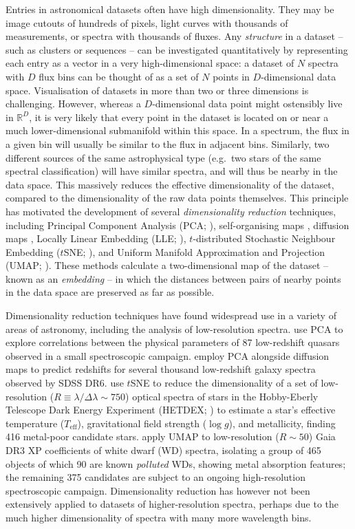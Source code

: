 \documentclass[fleqn,usenatbib]{mnras}
\def\Teff{T_\mathrm{eff}}
\begin{document}
Entries in astronomical datasets often have high dimensionality.
They may be image cutouts of hundreds of pixels, light curves with thousands of measurements, or spectra with thousands of fluxes.
Any \textit{structure} in a dataset -- such as clusters or sequences -- can be investigated quantitatively by representing each entry as a vector in a very high-dimensional space: a dataset of $N$ spectra with $D$ flux bins can be thought of as a set of $N$ points in $D$-dimensional data space.
Visualisation of datasets in more than two or three dimensions is challenging.
However, whereas a $D$-dimensional data point might ostensibly live in $\mathbb{R}^D$, it is very likely that every point in the dataset is located on or near a much lower-dimensional submanifold within this space.
In a spectrum, the flux in a given bin will usually be similar to the flux in adjacent bins.
Similarly, two different sources of the same astrophysical type (e.g.\ two stars of the same spectral classification) will have similar spectra, and will thus be nearby in the data space.
This massively reduces the effective dimensionality of the dataset, compared to the dimensionality of the raw data points themselves.
This principle has motivated the development of several \textit{dimensionality reduction} techniques, including Principal Component Analysis (PCA; \citealt{pca}), self-organising maps \citep{kohonen90}, diffusion maps \citep{coifman06, lafon06}, Locally Linear Embedding (LLE; \citealt{roweis00}), $t$-distributed Stochastic Neighbour Embedding ($t$SNE; \citealt{tsne}), and Uniform Manifold Approximation and Projection (UMAP; \citealt{umap}).
These methods calculate a two-dimensional map of the dataset -- known as an \textit{embedding} -- in which the distances between pairs of nearby points in the data space are preserved as far as possible.

Dimensionality reduction techniques have found widespread use in a variety of areas of astronomy, including the analysis of low-resolution spectra.
\citet{boroson92} use PCA to explore correlations between the physical parameters of 87 low-redshift quasars observed in a small spectroscopic campaign.
\citet{richards09} employ PCA alongside diffusion maps to predict redshifts for several thousand low-redshift galaxy spectra observed by SDSS DR6.
\citet{hawkins21} use $t$SNE to reduce the dimensionality of a set of low-resolution ($R\equiv \lambda / \Delta \lambda \sim750$) optical spectra of stars in the Hobby-Eberly Telescope Dark Energy Experiment (HETDEX; \citealt{gebhardt21}) to estimate a star's effective temperature ($\Teff$), gravitational field strength ($\log g$), and metallicity, finding 416 metal-poor candidate stars.
\citet{kao24} apply UMAP to low-resolution ($R\sim50$) Gaia DR3 XP coefficients of white dwarf (WD) spectra, isolating a group of 465 objects of which 90 are known \textit{polluted} WDs, showing metal absorption features; the remaining 375 candidates are subject to an ongoing high-resolution spectroscopic campaign.
Dimensionality reduction has however not been extensively applied to datasets of higher-resolution spectra, perhaps due to the much higher dimensionality of spectra with many more wavelength bins.
\end{document}
